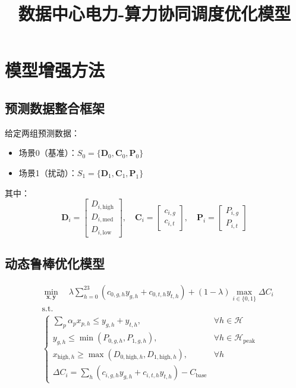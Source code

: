 \documentclass{article}
\title{数据中心电力-算力协同调度优化模型}
\author{}
\date{}
\begin{document}
\maketitle

\section{模型增强方法}
\subsection{预测数据整合框架}
给定两组预测数据：
\begin{itemize}
\item 场景0（基准）：$S_0 = \{\mathbf{D}_0, \mathbf{C}_0, \mathbf{P}_0\}$
\item 场景1（扰动）：$S_1 = \{\mathbf{D}_1, \mathbf{C}_1, \mathbf{P}_1\}$
\end{itemize}
其中：
$$
\mathbf{D}_i = \begin{bmatrix}
D_{i,\text{high}} \\ D_{i,\text{med}} \\ D_{i,\text{low}}
\end{bmatrix}, \quad
\mathbf{C}_i = \begin{bmatrix}
c_{i,g} \\ c_{i,t}
\end{bmatrix}, \quad
\mathbf{P}_i = \begin{bmatrix}
P_{i,g} \\ P_{i,t}
\end{bmatrix}
$$

\subsection{动态鲁棒优化模型}
\begin{equation}
\begin{aligned}
& \min_{\mathbf{x},\mathbf{y}} \quad \lambda \sum_{h=0}^{23} \left( c_{0,g,h}y_{g,h} + c_{0,t,h}y_{t,h} \right) + (1-\lambda) \max_{i \in \{0,1\}} \Delta C_i \\
& \text{s.t.} \\
& \begin{cases}
\sum_p \alpha_p x_{p,h} \leq y_{g,h} + y_{t,h}, & \forall h \in \mathcal{H} \\
y_{g,h} \leq \min(P_{0,g,h}, P_{1,g,h}), & \forall h \in \mathcal{H}_{\text{peak}} \\
x_{\text{high},h} \geq \max(D_{0,\text{high},h}, D_{1,\text{high},h}), & \forall h \\
\Delta C_i = \sum_h (c_{i,g,h}y_{g,h} + c_{i,t,h}y_{t,h}) - C_{\text{base}}
\end{cases}
\end{aligned}
\end{equation}
\end{document}
